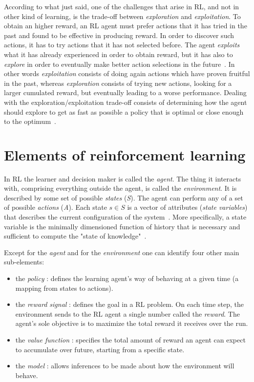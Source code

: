 According to what just said, one of the challenges that arise in RL, and not in other kind of learning, is the trade-off between \textit{exploration} and \textit{exploitation}. To obtain an higher reward, an RL agent must prefer actions that it has tried in the past and found to be effective in producing reward. In order to discover such actions, it has to try actions that it has not selected before. The agent \textit{exploits} what it has already experienced in order to obtain reward, but it has also to \textit{explore} in order to eventually make better action selections in the future~\cite{SuttonBarto}. In other words \textit{exploitation} consists of doing again actions which have proven fruitful in the past, whereas \textit{exploration} consists of trying new actions, looking for a larger cumulated reward, but eventually leading to a worse performance. Dealing with the exploration/exploitation trade-off consists of determining how the agent should explore to get as fast as possible a policy that is optimal or close enough to the optimum~\cite{Sigaud:2010:MDP:1841781}.

\section{Elements of reinforcement learning}

\paragraph{} In RL the learner and decision maker is called the \textit{agent}. The thing it interacts with, comprising everything outside the agent, is called the \textit{environment}. It is described by some set of possible \textit{states} (\textit{S}). The agent can perform any of a set of possible \textit{actions} (\textit{A}). Each state ${s \in S}$ is a vector of attributes (\textit{state variables}) that describes the current configuration of the system~\cite{Nevmyvaka}. More specifically, a state variable is the minimally dimensioned function of history that is necessary and sufficient to compute the "state of knowledge"~\cite{Powell}.

Except for the \textit{agent} and for the \textit{environment} one can identify four other main sub-elements: 

\begin{itemize}
  \item the \textit{policy} : defines the learning agent's way of behaving at a given time (a mapping from states to actions).
  \item the \textit{reward signal} : defines the goal in a RL problem. On each time step, the environment sends to the RL agent a single number called the \textit{reward}. The agent's sole objective is to maximize the total reward it receives over the run. 
  \item the \textit{value function} : specifies the total amount of reward an agent can expect to accumulate over future, starting from a specific state.
  \item the \textit{model} : allows inferences to be made about how the environment will behave.
\end{itemize}

